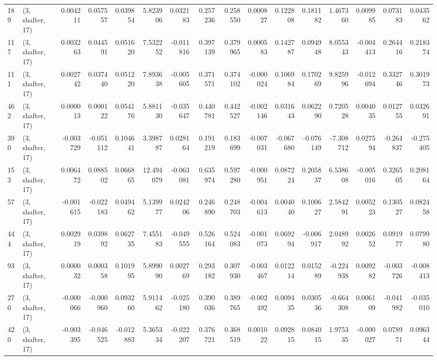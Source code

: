 \begin{tabular}{llrrrrrrrrrrrrrr}
189 &  (3, shafter, 17) &   0.004211 &  0.057557 &  0.039854 &     5.823906 &   0.032183 &   0.257236 &   0.258550 &  0.000827 &  0.122808 &  0.181182 &    1.467360 &  0.009985 &  0.073183 &  0.043562 \\
117 &  (3, shafter, 17) &   0.003263 &  0.044591 &  0.051620 &     7.532252 &  -0.011816 &   0.397139 &   0.379965 &  0.000583 &  0.142787 &  0.094948 &    8.055343 & -0.004413 &  0.264416 &  0.218374 \\
111 &  (3, shafter, 17) &   0.002742 &  0.037440 &  0.051220 &     7.893638 &  -0.005605 &   0.371571 &   0.374102 & -0.000024 &  0.106984 &  0.170269 &    9.825996 & -0.012694 &  0.332746 &  0.301973 \\
462 &  (3, shafter, 17) &   0.000013 &  0.000122 &  0.054176 &     5.881130 &  -0.035647 &   0.440781 &   0.442527 & -0.002146 &  0.031643 &  0.062290 &    0.720528 &  0.004035 &  0.012755 &  0.032691 \\
390 &  (3, shafter, 17) &  -0.003729 & -0.051112 &  0.104641 &     3.398787 &   0.028164 &   0.191219 &   0.183699 & -0.007031 & -0.067680 & -0.076149 &   -7.308712 &  0.027594 & -0.264837 & -0.275405 \\
153 &  (3, shafter, 17) &   0.006472 &  0.088502 &  0.066865 &    12.494079 &  -0.063081 &   0.635974 &   0.597280 & -0.000951 &  0.087224 &  0.205837 &    6.538608 & -0.005016 &  0.326505 &  0.208164 \\
57  &  (3, shafter, 17) &  -0.001615 & -0.022183 &  0.049462 &     5.139977 &   0.024206 &   0.246890 &   0.248703 & -0.004613 &  0.004040 &  0.100627 &    2.584291 &  0.005223 &  0.130527 &  0.082458 \\
444 &  (3, shafter, 17) &   0.002919 &  0.039892 &  0.062735 &     7.455183 &  -0.049555 &   0.526164 &   0.524083 & -0.001073 &  0.069294 & -0.006917 &    2.048992 &  0.002652 &  0.091977 &  0.079980 \\
93  &  (3, shafter, 17) &   0.000032 &  0.000358 &  0.101995 &     5.899090 &   0.002769 &   0.293182 &   0.307930 & -0.003467 &  0.012214 &  0.015289 &   -0.224938 &  0.009282 & -0.003726 & -0.008413 \\
270 &  (3, shafter, 17) &  -0.000066 & -0.000960 &  0.093260 &     5.911462 &  -0.025180 &   0.390036 &   0.389765 & -0.002492 &  0.009435 &  0.030536 &   -0.664308 &  0.006109 & -0.041982 & -0.035010 \\
420 &  (3, shafter, 17) &  -0.003395 & -0.046525 & -0.012883 &     5.365334 &  -0.022207 &   0.376721 &   0.368519 &  0.001022 &  0.092815 &  0.084015 &    1.975335 & -0.000027 &  0.078971 &  0.096344 \\

\end{tabular}

